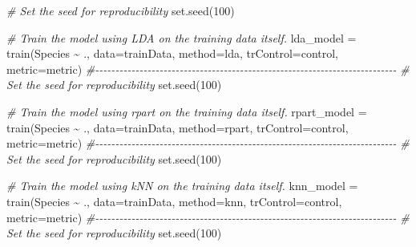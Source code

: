 \documentclass[
]{article}
\newenvironment{Shaded}{\begin{snugshade}}{\end{snugshade}}
\newcommand{\AttributeTok}[1]{\textcolor[rgb]{0.77,0.63,0.00}{#1}}
\newcommand{\CommentTok}[1]{\textcolor[rgb]{0.56,0.35,0.01}{\textit{#1}}}
\newcommand{\DecValTok}[1]{\textcolor[rgb]{0.00,0.00,0.81}{#1}}
\newcommand{\FunctionTok}[1]{\textcolor[rgb]{0.00,0.00,0.00}{#1}}
\newcommand{\NormalTok}[1]{#1}
\newcommand{\OtherTok}[1]{\textcolor[rgb]{0.56,0.35,0.01}{#1}}
\newcommand{\SpecialCharTok}[1]{\textcolor[rgb]{0.00,0.00,0.00}{#1}}
\newcommand{\StringTok}[1]{\textcolor[rgb]{0.31,0.60,0.02}{#1}}
\begin{document}
\begin{Shaded}
\begin{Highlighting}[]
\CommentTok{\# Set the seed for reproducibility}
\FunctionTok{set.seed}\NormalTok{(}\DecValTok{100}\NormalTok{)}

\CommentTok{\# Train the model using LDA on the training data itself.}
\NormalTok{lda\_model }\OtherTok{=} \FunctionTok{train}\NormalTok{(Species }\SpecialCharTok{\textasciitilde{}}\NormalTok{ ., }\AttributeTok{data=}\NormalTok{trainData, }\AttributeTok{method=}\StringTok{\textquotesingle{}lda\textquotesingle{}}\NormalTok{, }\AttributeTok{trControl=}\NormalTok{control, }\AttributeTok{metric=}\NormalTok{metric)}
\CommentTok{\#{-}{-}{-}{-}{-}{-}{-}{-}{-}{-}{-}{-}{-}{-}{-}{-}{-}{-}{-}{-}{-}{-}{-}{-}{-}{-}{-}{-}{-}{-}{-}{-}{-}{-}{-}{-}{-}{-}{-}{-}{-}{-}{-}{-}{-}{-}{-}{-}{-}{-}{-}{-}{-}{-}{-}{-}{-}{-}{-}{-}{-}{-}{-}{-}{-}{-}{-}{-}{-}{-}{-}{-}{-}{-}{-}}
\CommentTok{\# Set the seed for reproducibility}
\FunctionTok{set.seed}\NormalTok{(}\DecValTok{100}\NormalTok{)}

\CommentTok{\# Train the model using rpart on the training data itself.}
\NormalTok{rpart\_model }\OtherTok{=} \FunctionTok{train}\NormalTok{(Species }\SpecialCharTok{\textasciitilde{}}\NormalTok{ ., }\AttributeTok{data=}\NormalTok{trainData, }\AttributeTok{method=}\StringTok{\textquotesingle{}rpart\textquotesingle{}}\NormalTok{, }\AttributeTok{trControl=}\NormalTok{control, }\AttributeTok{metric=}\NormalTok{metric)}
\CommentTok{\#{-}{-}{-}{-}{-}{-}{-}{-}{-}{-}{-}{-}{-}{-}{-}{-}{-}{-}{-}{-}{-}{-}{-}{-}{-}{-}{-}{-}{-}{-}{-}{-}{-}{-}{-}{-}{-}{-}{-}{-}{-}{-}{-}{-}{-}{-}{-}{-}{-}{-}{-}{-}{-}{-}{-}{-}{-}{-}{-}{-}{-}{-}{-}{-}{-}{-}{-}{-}{-}{-}{-}{-}{-}{-}{-}}
\CommentTok{\# Set the seed for reproducibility}
\FunctionTok{set.seed}\NormalTok{(}\DecValTok{100}\NormalTok{)}

\CommentTok{\# Train the model using kNN on the training data itself.}
\NormalTok{knn\_model }\OtherTok{=} \FunctionTok{train}\NormalTok{(Species }\SpecialCharTok{\textasciitilde{}}\NormalTok{ ., }\AttributeTok{data=}\NormalTok{trainData, }\AttributeTok{method=}\StringTok{\textquotesingle{}knn\textquotesingle{}}\NormalTok{, }\AttributeTok{trControl=}\NormalTok{control, }\AttributeTok{metric=}\NormalTok{metric)}
\CommentTok{\#{-}{-}{-}{-}{-}{-}{-}{-}{-}{-}{-}{-}{-}{-}{-}{-}{-}{-}{-}{-}{-}{-}{-}{-}{-}{-}{-}{-}{-}{-}{-}{-}{-}{-}{-}{-}{-}{-}{-}{-}{-}{-}{-}{-}{-}{-}{-}{-}{-}{-}{-}{-}{-}{-}{-}{-}{-}{-}{-}{-}{-}{-}{-}{-}{-}{-}{-}{-}{-}{-}{-}{-}{-}{-}{-}}
\CommentTok{\# Set the seed for reproducibility}
\FunctionTok{set.seed}\NormalTok{(}\DecValTok{100}\NormalTok{)}


\end{Highlighting}
\end{Shaded}
\end{document}
